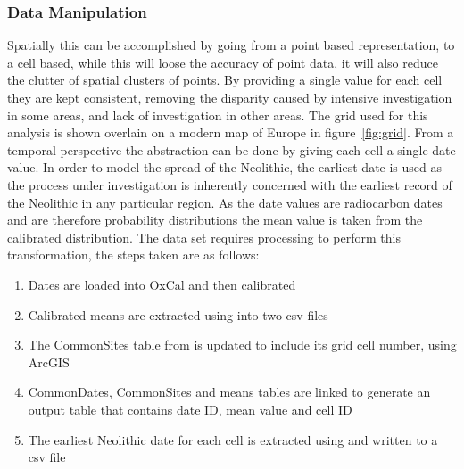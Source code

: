\subsubsection{Data Manipulation}
Spatially this can be accomplished by going from a point based representation, to a cell based, while this will loose the accuracy of point data, it will also reduce the clutter of spatial clusters of points. By providing a single value for each cell they are kept consistent, removing the disparity caused by intensive investigation in some areas, and lack of investigation in other areas. The grid used for this analysis is shown overlain on a modern map of Europe in figure~\ref{fig:grid}. From a temporal perspective the abstraction can be done by giving each cell a single date value. In order to model the spread of the Neolithic, the earliest date is used as the process under investigation is inherently concerned with the earliest record of the Neolithic in any particular region. As the date values are radiocarbon dates and are therefore probability distributions the mean value is taken from the calibrated distribution. The data set requires processing to perform this transformation, the steps taken are as follows:
\begin{enumerate}
\item Dates are loaded into OxCal and then calibrated
\item Calibrated means are extracted using \citet{doug_cowie_2018_1297321} into two csv files
\item The CommonSites table from \citet{Manning:2016fk} is updated to include its grid cell number, using ArcGIS
\item CommonDates, CommonSites and means tables are linked to generate an output table that contains date ID, mean value and cell ID
\item The earliest Neolithic date for each cell is extracted using \citet{doug_cowie_2018_1297321}  and written to a csv file
\end{enumerate}

